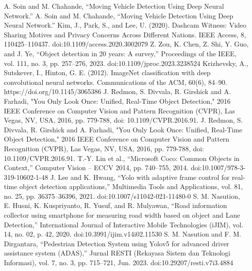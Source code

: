 \documentclass[conference]{IEEEtran}
\begin{document}

\begin{thebibliography}{00}
 A. Soin and M. Chahande, “Moving Vehicle Detection Using Deep Neural Network.” A. Soin and M. Chahande, “Moving Vehicle Detection Using Deep Neural Network.” 
 Kim, J., Park, S., and Lee, U. (2020). Dashcam Witness: Video Sharing Motives and Privacy Concerns Across Different Nations. IEEE Access, 8, 110425–110437. doi:10.1109/access.2020.3002079 
 Z. Zou, K. Chen, Z. Shi, Y. Guo, and J. Ye, “Object detection in 20 years: A survey,” Proceedings of the IEEE, vol. 111, no. 3, pp. 257–276, 2023. doi:10.1109/jproc.2023.3238524 
 Krizhevsky, A., Sutskever, I., Hinton, G. E. (2012). ImageNet classification with deep convolutional neural networks. Communications of the ACM, 60(6), 84–90. https://doi.org/10.1145/3065386
J. Redmon, S. Divvala, R. Girshick and A. Farhadi, "You Only Look Once: Unified, Real-Time Object Detection," 2016 IEEE Conference on Computer Vision and Pattern Recognition (CVPR), Las Vegas, NV, USA, 2016, pp. 779-788, doi: 10.1109/CVPR.2016.91.
J. Redmon, S. Divvala, R. Girshick and A. Farhadi, "You Only Look Once: Unified, Real-Time Object Detection," 2016 IEEE Conference on Computer Vision and Pattern Recognition (CVPR), Las Vegas, NV, USA, 2016, pp. 779-788, doi: 10.1109/CVPR.2016.91.
 T.-Y. Lin et al., “Microsoft Coco: Common Objects in Context,” Computer Vision – ECCV 2014, pp. 740–755, 2014. doi:10.1007/978-3-319-10602-1-48
 J. Lee and K. Hwang, “Yolo with adaptive frame control for real-time object detection applications,” Multimedia Tools and Applications, vol. 81, no. 25, pp. 36375–36396, 2021. doi:10.1007/s11042-021-11480-0
 S. M. Nasution, E. Husni, K. Kuspriyanto, R. Yusuf, and R. Mulyawan, “Road information collector using smartphone for measuring road width based on object and Lane Detection,” International Journal of Interactive Mobile Technologies (iJIM), vol. 14, no. 02, p. 42, 2020. doi:10.3991/ijim.v14i02.11530 
 S. M. Nasution and F. M. Dirgantara, “Pedestrian Detection System using Yolov5 for advanced driver assistance system (ADAS),” Jurnal RESTI (Rekayasa Sistem dan Teknologi Informasi), vol. 7, no. 3, pp. 715–721, Jun. 2023. doi:10.29207/resti.v7i3.4884 
\end{thebibliography}
\vspace{12pt}
\color{red}
\end{document}
